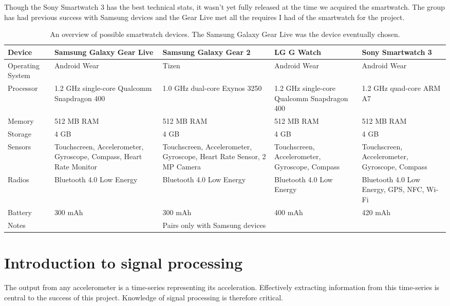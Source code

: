      Though the Sony Smartwatch 3 has the best technical stats, it wasn't yet fully released at the time we acquired the smartwatch. The group has had previous success with Samsung devices and the Gear Live met all the requires I had of the smartwatch for the project.
      \begin{table}
        \centering
        {\tabulinesep=1.2mm
        \begin{tabu} to 
          Device & \textbf{Samsung Galaxy Gear Live} & \textbf{Samsung Galaxy Gear 2} &\textbf{ LG G Watch} & \textbf{Sony Smartwatch 3} \\
          \hline
          Operating System & Android Wear & Tizen & Android Wear & Android Wear \\
          \hline
          Processor & 1.2 GHz single-core Qualcomm Snapdragon 400 & 1.0 GHz dual-core Exynos 3250 & 1.2 GHz single-core Qualcomm Snapdragon 400 & 1.2 GHz quad-core ARM A7 \\
          \hline
          Memory & 512 MB RAM & 512 MB RAM & 512 MB RAM & 512 MB RAM \\
          \hline
          Storage & 4 GB & 4 GB & 4 GB & 4 GB \\
          \hline
          Sensors & Touchscreen, Accelerometer, Gyroscope, Compass, Heart Rate Monitor & Touchscreen, Accelerometer, Gyroscope, Heart Rate Sensor, 2 MP Camera & Touchscreen, Accelerometer, Gyroscope, Compass & Touchscreen, Accelerometer, Gyroscope, Compass \\
          \hline
          Radios & Bluetooth 4.0 Low Energy & Bluetooth 4.0 Low Energy & Bluetooth 4.0 Low Energy & Bluetooth 4.0 Low Energy, GPS, NFC, Wi-Fi \\
          \hline
          Battery & 300 mAh & 300 mAh & 400 mAh & 420 mAh \\
          \hline
          Notes &  & Pairs only with Samsung devices &  & \\
          \hline
          
        \end{tabu}}
        \caption{An overview of possible smartwatch devices. The Samsung Galaxy Gear Live was the device eventually chosen.}
        \label{tab:smartwatch-features}
      \end{table}
  
  \section{Introduction to signal processing}
    \label{sec:intro-sig-processing}
    The output from any accelerometer is a time-series representing its acceleration. Effectively extracting information from this time-series is central to the success of this project. Knowledge of signal processing is therefore critical.
    
